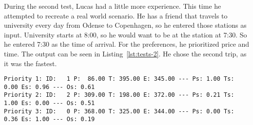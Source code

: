 During the second test, Lucas had a little more experience.
This time he attempted to recreate a real world scenario.
He has a friend that travels to university every day from Odense to Copenhagen, so he entered those stations as input.
University starts at 8:00, so he would want to be at the station at 7:30.
So he entered 7:30 as the time of arrival.
For the preferences, he prioritized price and time.
The output can be seen in Listing~\ref{lst:tests-2}.
He chose the second trip, as it was the fastest.

\begin{lstlisting}[label={lst:tests-2}, caption={Odense St. To Copenhagen St.}, captionpos=b, language={}]
Priority 1: ID:   1 P:  86.00 T: 395.00 E: 345.00 --- Ps: 1.00 Ts: 0.00 Es: 0.96 --- Os: 0.61
Priority 2: ID:   2 P: 309.00 T: 198.00 E: 372.00 --- Ps: 0.21 Ts: 1.00 Es: 0.00 --- Os: 0.51
Priority 3: ID:   0 P: 368.00 T: 325.00 E: 344.00 --- Ps: 0.00 Ts: 0.36 Es: 1.00 --- Os: 0.19
\end{lstlisting}
